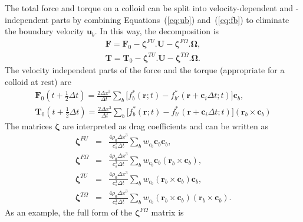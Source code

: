 The total force and torque on a colloid can be split into velocity-dependent
and -independent parts by combining Equations~(\ref{eq:ub})
and~(\ref{eq:fb}) to eliminate the boundary velocity $\mathbf{u}_b$.
In this way, the decomposition is
\begin{eqnarray}
\mathbf{F} = \mathbf{F}_0 - \boldsymbol{\zeta}^{FU}.\mathbf{U}
-\boldsymbol{\zeta}^{F\Omega}.\mathbf{\Omega},
\label{eq:d3}
\\
\mathbf{T} = \mathbf{T}_0 - \boldsymbol{\zeta}^{TU}.\mathbf{U}
-\boldsymbol{\zeta}^{T\Omega}.\mathbf{\Omega}.
\label{eq:d4}
\end{eqnarray}
The velocity independent parts of the force and the torque
(appropriate for a colloid at rest) are
\begin{eqnarray}
\mathbf{F}_0(t + {\scriptstyle\frac{1}{2}}\Delta t) =
\frac{2\Delta x^3}{\Delta t} \sum_b \big[ f_b^\ast(\mathbf{r}; t)
- f_{b'}^\ast(\mathbf{r} + \mathbf{c}_i \Delta t; t) \big] \mathbf{c}_b,
\\
\mathbf{T}_0(t + {\scriptstyle\frac{1}{2}}\Delta t) =
\frac{2\Delta x^3}{\Delta t} \sum_b \big[ f_b^\ast(\mathbf{r}; t)
- f_{b'}^\ast(\mathbf{r} + \mathbf{c}_i \Delta t; t) \big]
(\mathbf{r}_b\times \mathbf{c}_b)
\end{eqnarray}
The matrices $\boldsymbol{\zeta}$ are interpreted as drag
coefficients and can be written as
\begin{eqnarray}
\mathbf{\boldsymbol{\zeta}}^{FU} &=& \frac{4\rho_0 \Delta x^3}{c_s^2 \Delta t}
\sum_b w_{c_b} \mathbf{c}_b \mathbf{c}_b,
\\
\mathbf{\boldsymbol{\zeta}}^{F\Omega} &=&
\frac{4\rho_0 \Delta x^3}{c_s^2 \Delta t}
\sum_b w_{c_b} \mathbf{c}_b (\mathbf{r}_b \times \mathbf{c}_b),
\\
\mathbf{\boldsymbol{\zeta}}^{TU} &=& \frac{4\rho_0 \Delta x^3}{c_s^2 \Delta t}
\sum_b w_{c_b} (\mathbf{r}_b \times \mathbf{c}_b) \mathbf{c}_b,
\\
\mathbf{\boldsymbol{\zeta}}^{T\Omega} &=&
\frac{4\rho_0 \Delta x^3}{c_s^2 \Delta t}
\sum_b w_{c_b} (\mathbf{r}_b \times \mathbf{c}_b)
(\mathbf{r}_b \times \mathbf{c}_b).
\end{eqnarray}
As an example, the full form of the $\boldsymbol{\zeta}^{F\Omega}$ matrix is

